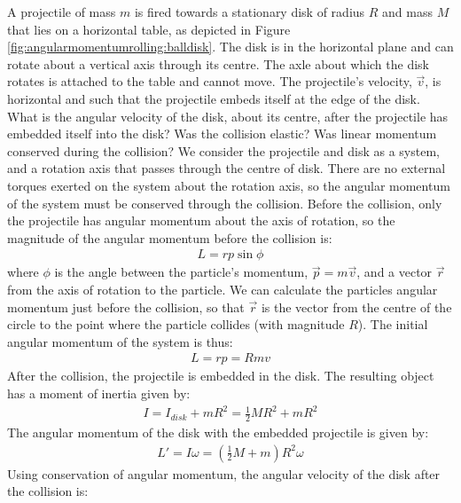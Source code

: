 \begin{example}{
A projectile of mass $m$ is fired towards a stationary disk of radius $R$ and mass $M$ that lies on a horizontal table, as depicted in Figure \ref{fig:angularmomentumrolling:balldisk}. The disk is in the horizontal plane and can rotate about a vertical axis through its centre. The axle about which the disk rotates is attached to the table and cannot move. The projectile's velocity, $\vec v$, is horizontal and such that the projectile embeds itself at the edge of the disk.  What is the angular velocity of the disk, about its centre, after the projectile has embedded itself into the disk? Was the collision elastic? Was linear momentum conserved during the collision?}
We consider the projectile and disk as a system, and a rotation axis that passes through the centre of disk. There are no external torques exerted on the system about the rotation axis, so the angular momentum of the system must be conserved through the collision. Before the collision, only the projectile has angular momentum about the axis of rotation, so the magnitude of the angular momentum before the collision is:
\begin{align*}
L = rp\sin\phi
\end{align*}
where $\phi$ is the angle between the particle's momentum, $\vec p=m\vec v$, and a vector $\vec r$ from the axis of rotation to the particle. We can calculate the particles angular momentum just before the collision, so that $\vec r$ is the vector from the centre of the circle to the point where the particle collides (with magnitude $R$). The initial angular momentum of the system is thus:
\begin{align*}
L=rp=Rmv
\end{align*}
After the collision, the projectile is embedded in the disk. The resulting object has a moment of inertia given by:
\begin{align*}
I = I_{disk}+mR^2 = \frac{1}{2}MR^2+mR^2
\end{align*}
The angular momentum of the disk with the embedded projectile is given by:
\begin{align*}
L'=I\omega = \left(\frac{1}{2}M+m\right)R^2\omega
\end{align*}
Using conservation of angular momentum, the angular velocity of the disk after the collision is:

\end{example}
